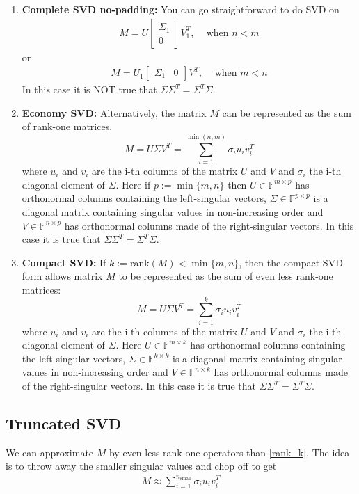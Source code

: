 \documentclass[11.5pt]{article}
\theoremstyle{definition}
\begin{document}
\begin{enumerate}
\item \textbf{Complete SVD no-padding:} You can go straightforward to do SVD on 
\begin{align*}
M=U
\begin{bmatrix}
\Sigma_1 \\ 
0
\end{bmatrix} V_1^T,\;\;\;\text{ when }n<m 
\end{align*}
or 
\begin{align*}
M=U_1
\begin{bmatrix}
\Sigma_1 & 
0
\end{bmatrix} V^T,\;\;\;\text{ when }m<n 
\end{align*}
In this case it is NOT true that $\Sigma\Sigma^T=\Sigma^T\Sigma$.  
\item \textbf{Economy SVD:} Alternatively, the matrix $M$ can be represented as the sum of rank-one matrices,
$$
M =U\Sigma V^T= \sum_{i=1}^{\min{(n,m)}} \sigma_i u_i v_i^{T}
$$
where $u_i$ and $v_i$ are the i-th columns of the matrix $U$ and $V$ and $\sigma_i$ the i-th diagonal element of $\Sigma$. Here if $p:=\min\{m,n\}$ then $U\in\mathbb{F}^{m\times p}$ has orthonormal columns containing the left-singular vectors, $\Sigma\in\mathbb{F}^{p\times p}$ is a diagonal matrix containing singular values in non-increasing order and $V\in\mathbb{F}^{n\times p}$ has orthonormal columns made of the right-singular vectors.
In this case it is true that $\Sigma\Sigma^T=\Sigma^T\Sigma$.

\item \textbf{Compact SVD:} If $k:=\text{rank}(M)<\min\{m,n\}$, then the compact SVD form allows matrix $M$ to be represented as the sum of even less rank-one matrices:
\begin{equation}\label{rank_k}
M =U\Sigma V^T= \sum_{i=1}^{k} \sigma_i u_i v_i^{T}
\end{equation}
where $u_i$ and $v_i$ are the i-th columns of the matrix $U$ and $V$ and $\sigma_i$ the i-th diagonal element of $\Sigma$. Here $U\in\mathbb{F}^{m\times k}$ has orthonormal columns containing the left-singular vectors, $\Sigma\in\mathbb{F}^{k\times k}$ is a diagonal matrix containing singular values in non-increasing order and $V\in\mathbb{F}^{n\times k}$ has orthonormal columns made of the right-singular vectors. In this case it is true that $\Sigma\Sigma^T=\Sigma^T\Sigma$.
\end{enumerate}
\subsection{Truncated SVD}
We can approximate $M$ by even less rank-one operators than \eqref{rank_k}. The idea is to throw away the smaller singular values and chop off to get
\begin{align*}
M\approx \sum_{i=1}^{n_{\text{small}}}\sigma_i u_i v_i^{T}
\end{align*}
\end{document}
